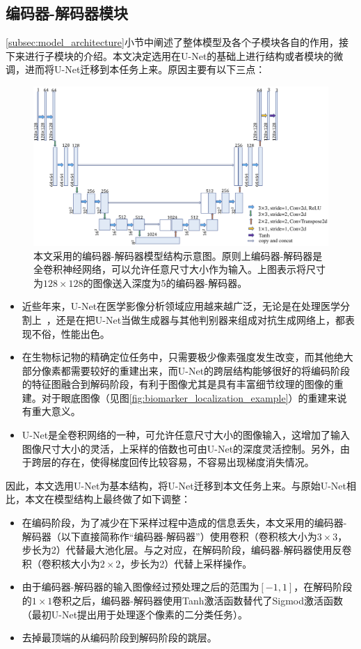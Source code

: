 \subsection{编码器-解码器模块}\label{subsec:encoder_decoder_model}
\ref{subsec:model_architecture}小节中阐述了整体模型及各个子模块各自的作用，接下来进行子模块的介绍。本文决定选用在U-Net的基础上进行结构或者模块的微调，进而将U-Net迁移到本任务上来。原因主要有以下三点：
\begin{figure}[h]
	\centering
	\includegraphics[width=1.0\textwidth]{figure/auto_encoder_architecture.png}
	\caption{本文采用的编码器-解码器模型结构示意图。原则上编码器-解码器是全卷积神经网络，可以允许任意尺寸大小作为输入。上图表示将尺寸为$128\times 128$的图像送入深度为5的编码器-解码器。}
	\label{fig:auto_encoder_architecture}
\end{figure}
\begin{itemize}
	\item 近些年来，U-Net在医学影像分析领域应用越来越广泛，无论是在处理医学分割上~\cite{oktay2018attention, dong2017automatic, zhang2018ct}，还是在把U-Net当做生成器与其他判别器来组成对抗生成网络上，都表现不俗，性能出色。
	\item 在生物标记物的精确定位任务中，只需要极少像素强度发生改变，而其他绝大部分像素都需要较好的重建出来，而U-Net的跨层结构能够很好的将编码阶段的特征图融合到解码阶段，有利于图像尤其是具有丰富细节纹理的图像的重建。对于眼底图像（见图\ref{fig:biomarker_localization_example}）的重建来说有重大意义。
	\item U-Net是全卷积网络的一种，可允许任意尺寸大小的图像输入，这增加了输入图像尺寸大小的灵活，上采样的倍数也可由U-Net的深度灵活控制。另外，由于跨层的存在，使得梯度回传比较容易，不容易出现梯度消失情况。
\end{itemize}
因此，本文选用U-Net为基本结构，将U-Net迁移到本文任务上来。与原始U-Net相比，本文在模型结构上最终做了如下调整：
\begin{itemize}
	\item 在编码阶段，为了减少在下采样过程中造成的信息丢失，本文采用的编码器-解码器（以下直接简称作“编码器-解码器”）使用卷积（卷积核大小为$3\times 3$，步长为2）代替最大池化层。与之对应，在解码阶段，编码器-解码器使用反卷积（卷积核大小为$2\times 2$，步长为2）代替上采样操作。
	\item 由于编码器-解码器的输入图像经过预处理之后的范围为$[-1,1]$，在解码阶段的$1\times 1$卷积之后，编码器-解码器使用Tanh激活函数替代了Sigmod激活函数（最初U-Net提出用于处理逐个像素的二分类任务）。
	\item 去掉最顶端的从编码阶段到解码阶段的跳层。
\end{itemize}
